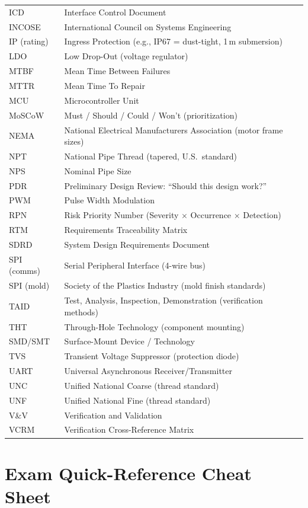 \documentclass[11pt,letterpaper,twoside,openany]{book}
\begin{document}
\begin{longtable}{l p{10cm}}
ICD & Interface Control Document \\
INCOSE & International Council on Systems Engineering \\
IP (rating) & Ingress Protection (e.g., IP67 = dust-tight, 1\,m submersion) \\
LDO & Low Drop-Out (voltage regulator) \\
MTBF & Mean Time Between Failures \\
MTTR & Mean Time To Repair \\
MCU & Microcontroller Unit \\
MoSCoW & Must / Should / Could / Won't (prioritization) \\
NEMA & National Electrical Manufacturers Association (motor frame sizes) \\
NPT & National Pipe Thread (tapered, U.S.\ standard) \\
NPS & Nominal Pipe Size \\
PDR & Preliminary Design Review: ``Should this design work?'' \\
PWM & Pulse Width Modulation \\
RPN & Risk Priority Number (Severity $\times$ Occurrence $\times$ Detection) \\
RTM & Requirements Traceability Matrix \\
SDRD & System Design Requirements Document \\
SPI (comms) & Serial Peripheral Interface (4-wire bus) \\
SPI (mold) & Society of the Plastics Industry (mold finish standards) \\
TAID & Test, Analysis, Inspection, Demonstration (verification methods) \\
THT & Through-Hole Technology (component mounting) \\
SMD/SMT & Surface-Mount Device / Technology \\
TVS & Transient Voltage Suppressor (protection diode) \\
UART & Universal Asynchronous Receiver/Transmitter \\
UNC & Unified National Coarse (thread standard) \\
UNF & Unified National Fine (thread standard) \\
V\&V & Verification and Validation \\
VCRM & Verification Cross-Reference Matrix \\
\bottomrule
\end{longtable}

\chapter*{Exam Quick-Reference Cheat Sheet}
\end{document}
